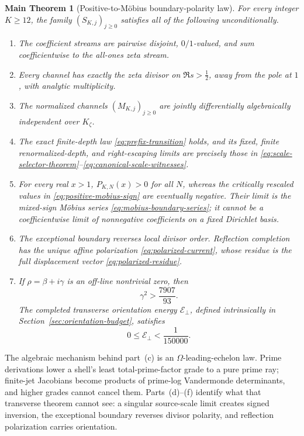 \documentclass[11pt]{article}
\newtheorem*{maintheorem}{Main Theorem}
\theoremstyle{definition}
\theoremstyle{remark}
\begin{document}
\begin{maintheorem}[Positive-to-M\"obius boundary-polarity law]
\label{thm:main-intro}
For every integer \(K\geq12\), the family \((S_{K,j})_{j\geq0}\) satisfies all of the following
unconditionally.
\begin{enumerate}[label=\textup{(\alph*)}]
\item The coefficient streams are pairwise disjoint, \(0/1\)-valued, and sum coefficientwise to
the all-ones zeta stream.
\item Every channel has exactly the zeta divisor on \(\Re s>\tfrac12\), away from the pole at
\(1\), with analytic multiplicity.
\item The normalized channels \((M_{K,j})_{j\geq0}\) are jointly differentially algebraically
independent over \(K_\zeta\).
\item The exact finite-depth law \eqref{eq:prefix-transition} holds, and its fixed, finite
renormalized-depth, and right-escaping limits are precisely those in
\eqref{eq:scale-selector-theorem}--\eqref{eq:canonical-scale-witnesses}.
\item For every real \(x>1\), \(P_{K,N}(x)>0\) for all \(N\), whereas the critically rescaled
values in \eqref{eq:positive-mobius-sign} are eventually negative.  Their limit is the
mixed-sign M\"obius series \eqref{eq:mobius-boundary-series}; it cannot be a coefficientwise
limit of nonnegative coefficients on a fixed Dirichlet basis.
\item The exceptional boundary reverses local divisor order.  Reflection completion has the
unique affine polarization \eqref{eq:polarized-current},
whose residue is the full displacement vector \eqref{eq:polarized-residue}.
\item If \(\rho=\beta+i\gamma\) is an off-line nontrivial zero, then
\[
 \gamma^2>\frac{7907}{93}.
 \tag{1.17}
\]
The completed transverse orientation energy \(\mathcal E_\perp\), defined intrinsically in
Section~\ref{sec:orientation-budget}, satisfies
\[
 0\leq\mathcal E_\perp
 <\frac1{150000}.
 \tag{1.18}
\]
\end{enumerate}
\end{maintheorem}

The algebraic mechanism behind part~\textup{(c)} is an
\(\Omega\)-leading-echelon law.  Prime derivations lower a shell's least total-prime-factor
grade to a pure prime ray; finite-jet Jacobians become products of prime-log Vandermonde
determinants, and higher grades cannot cancel them.  Parts~\textup{(d)}--\textup{(f)}
identify what that transverse theorem cannot see: a singular source-scale limit creates signed
inversion, the exceptional boundary reverses divisor polarity, and reflection polarization
carries orientation.
\end{document}
